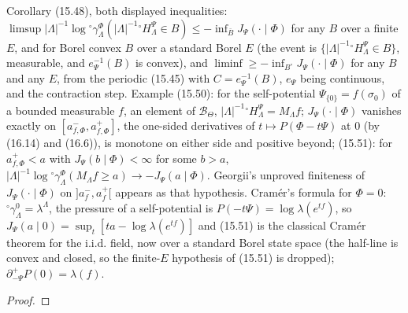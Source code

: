 \begin{theorem}
    Corollary (15.48), both displayed inequalities: $\limsup |\Lambda|^{-1}\log{}^\circ\gamma^\Phi_\Lambda
    (|\Lambda|^{-1}{}^\circ H^\Psi_\Lambda \in B) \leq -\inf_{\bar B} J_\Psi(\cdot\mid\Phi)$ for any
    $B$ over a finite $E$, and for Borel convex $B$ over a standard Borel $E$ (the event is
    $\{|\Lambda|^{-1}{}^\circ H^\Psi_\Lambda \in B\}$, measurable, and $e_\Psi^{-1}(B)$ is convex),
    and $\liminf \geq -\inf_{B^\circ} J_\Psi(\cdot\mid\Phi)$ for any $B$ and any $E$, from the
    periodic (15.45) with $C = e_\Psi^{-1}(B)$, $e_\Psi$ being continuous, and the contraction step. Example
    (15.50): for the self-potential $\Psi_{\{0\}} = f(\sigma_0)$ of a bounded measurable $f$, an
    element of $\mathcal B_\Theta$, $|\Lambda|^{-1}{}^\circ H^\Psi_\Lambda = M_\Lambda f$;
    $J_\Psi(\cdot\mid\Phi)$ vanishes exactly on $[a^-_{f,\Phi}, a^+_{f,\Phi}]$, the one-sided
    derivatives of $t \mapsto P(\Phi - t\Psi)$ at $0$ (by (16.14) and (16.6)), is monotone on
    either side and positive beyond; (15.51): for $a^+_{f,\Phi} < a$ with $J_\Psi(b\mid\Phi) < \infty$
    for some $b > a$, $|\Lambda|^{-1}\log{}^\circ\gamma^\Phi_\Lambda(M_\Lambda f \geq a) \to
    -J_\Psi(a\mid\Phi)$. Georgii's unproved finiteness of $J_\Psi(\cdot\mid\Phi)$ on $]a^-_f, a^+_f[$
    appears as that hypothesis. Cram\'er's formula for $\Phi = 0$: ${}^\circ\gamma^0_\Lambda = \lambda^\Lambda$, the
    pressure of a self-potential is $P(-t\Psi) = \log\lambda(e^{tf})$, so $J_\Psi(a\mid 0) = \sup_t[ta -
    \log\lambda(e^{tf})]$ and (15.51) is the classical Cram\'er theorem for the i.i.d. field, now over a
    standard Borel state space (the half-line is convex and closed, so the finite-$E$ hypothesis of
    (15.51) is dropped); $\partial^+_{-\Psi}P(0) = \lambda(f)$.
\end{theorem}
\begin{proof}
    \leanok
\end{proof}


